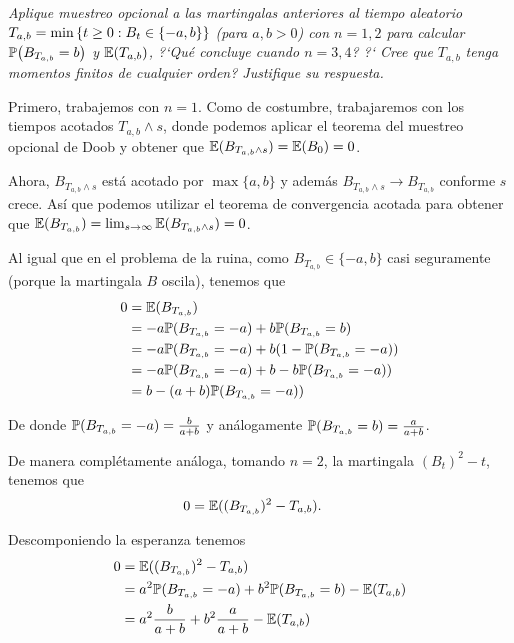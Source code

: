 \emph{
    Aplique muestreo opcional a las martingalas anteriores al tiempo 
    aleatorio $T_{a,b}=\min\set{t\geq 0:B_t\in\set{-a,b}}$ (para $a,b>0$) 
    con $n=1,2$ para calcular $\proba{B_{T_{a,b}}=b}$ y $\esp{T_{a,b}}$,
    ?`Qu\'e concluye cuando $n=3,4$? ?` Cree que $T_{a,b}$ tenga momentos 
    finitos de cualquier orden? Justifique su respuesta.\pn
}

\afterstatement\pn

Primero, trabajemos con $n=1$. Como de costumbre, trabajaremos con los tiempos acotados $T_{a,b} \wedge s$, donde podemos aplicar
el teorema del muestreo opcional de Doob y obtener que $\E(B_{T_{a,b} \wedge s}) = \E(B_0) = 0$.\pn

Ahora, $B_{T_{a,b} \wedge s}$ está acotado por $\max\{ a, b\}$ y además $B_{T_{a,b} \wedge s} \longrightarrow B_{T_{a,b}}$
conforme $s$ crece. Así que podemos utilizar el teorema de convergencia acotada para obtener que 
$\E(B_{T_{a,b}})  = \lim_{s \rightarrow \infty} \E(B_{T_{a,b} \wedge s}) = 0$.\pn

Al igual que en el problema de la ruina, como $B_{T_{a,b}} \in \{-a, b\}$ casi seguramente (porque la martingala $B$ oscila), 
tenemos que 
\begin{align}
    0   &=  \E(B_{T_{a,b}})                                     \\
        &= -a \P(B_{T_{a,b}} = -a) + b \P(B_{T_{a,b}} = b)      \\
        &= -a \P(B_{T_{a,b}} = -a) + b (1-\P(B_{T_{a,b}} = -a)) \\   
        &= -a \P(B_{T_{a,b}} = -a) + b - b\P(B_{T_{a,b}} = -a)) \\   
        &= b - (a+b)\P(B_{T_{a,b}} = -a)) \\   
\end{align}

De donde $\P(B_{T_{a,b}} = -a) = \frac{b}{a+b}$ y análogamente $\P(B_{T_{a,b}} = b) = \frac{a}{a+b}$.\pn

De manera complétamente análoga, tomando $n=2$, la martingala $(B_t)^2 -t$, tenemos que
\begin{align}
    0   &=  \E((B_{T_{a,b}})^2 -{T_{a,b}}).
\end{align}

Descomponiendo la esperanza tenemos
\begin{align}
    0   &=  \E((B_{T_{a,b}})^2 -{T_{a,b}})                                      \\
        &=  a^2 \P(B_{T_{a,b}} = -a) + b^2 \P(B_{T_{a,b}} = b) - \E(T_{a,b})    \\
        &=  a^2 \frac{b}{a+b} + b^2 \frac{a}{a+b} - \E(T_{a,b})
\end{align}

